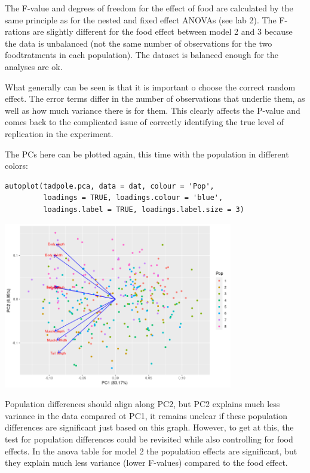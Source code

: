 \documentclass{article}
\begin{document}
The F-value and degrees of freedom for the effect of food are calculated by the same principle as for the nested and fixed effect ANOVAs (see lab 2). The F-rations are slightly different for the food effect between model 2 and 3 because the data is unbalanced (not the same number of observations for the two foodtratments in each population). The dataset is balanced enough for the analyses are ok. \par 
What generally can be seen is that it is important o choose the correct random effect. The error terms differ in the number of observations that underlie them, as well as how much variance there is for them. This clearly affects the P-value and comes back to the complicated issue of correctly identifying the true level of replication in the experiment.\par 
The PCs here can be plotted again, this time with the population in different colors:
\begin{lstlisting}
autoplot(tadpole.pca, data = dat, colour = 'Pop',
         loadings = TRUE, loadings.colour = 'blue',
         loadings.label = TRUE, loadings.label.size = 3)
\end{lstlisting}
\begin{center}
    \includegraphics[width = 0.75\textwidth]{lab4/tadpole-pca-food.png}
\end{center}

Population differences should align along PC2, but PC2 explains much less variance in the data compared ot PC1, it remains unclear if these population differences are significant just based on this graph. However, to get at this, the test for population differences could be revisited while also controlling for food effects. In the anova table for model 2 the population effects are significant, but they explain much less variance (lower F-values) compared to the food effect.
\end{document}
